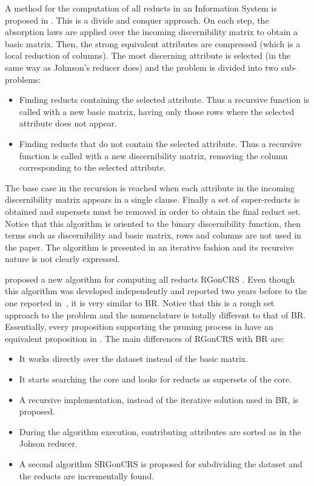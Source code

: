 \documentclass[authoryear,11pt]{elsarticle}
\makeatletter
\newcommand{\setword}[2]{%
  \phantomsection
  #1\def\@currentlabel{\unexpanded{#1}}\label{#2}%
}
\makeatother
\begin{document}
  A method for the computation of all reducts in an Information System is proposed in
  \citep{Starzyk99,Starzyk00}.
  This is a divide and conquer approach. On each step, the absorption laws are applied over the incoming
  discernibility matrix to obtain a basic matrix. Then, the strong equivalent attributes are compressed
  (which is a local reduction of columns). The most discerning attribute is selected (in the same way as 
  Johnson's reducer does) and the problem is divided into two sub-problems: 
  \begin{itemize}
  \item Finding reducts containing the selected attribute. Thus a recursive function is called with a new basic 
  matrix, having only those rows where the selected attribute does not appear.
  \item Finding reducts that do not contain the selected attribute. Thus a recursive function is called with a new 
  discernibility matrix, removing the column corresponding to the selected attribute.
  \end{itemize}
  The base case in the recursion is reached when each attribute in the incoming discernibility matrix appears 
  in a single clause. Finally a set of super-reducts is obtained and supersets must be removed in order to obtain 
  the final reduct set.
  Notice that this algorithm is oriented to the binary discernibility function, then 
  terms such as discernibility and basic matrix, rows and columns are not used in the paper. The
  algorithm is presented in an iterative fashion and its recursive nature is not clearly expressed.
  
  \cite{WangP07} proposed a new algorithm for computing all reducts \setword{RGonCRS}{RGonCRS}. 
  Even though this algorithm 
  was developed independently and reported two years before to the one reported in~\citep{Lias09}, it is very 
  similar to BR. Notice that this is a rough set approach to the problem and the nomenclature is totally 
  different to that of BR. Essentially, every proposition supporting the pruning process in \citep{WangP07} 
  have an equivalent proposition in \citep{Lias09}. The main differences of RGonCRS with BR are:
  \begin{itemize}
  \item It works directly over the dataset instead of the basic matrix.
  \item It starts searching the core and looks for reducts as supersets of the core.
  \item A recursive implementation, instead of the iterative solution used in BR, is proposed.
  \item During the algorithm execution, contributing attributes are sorted as in the Johson reducer.
  \item A second algorithm \setword{SRGonCRS}{SRGonCRS} is proposed for subdividing the dataset and the reducts are
  		incrementally found.
  \end{itemize}
  
\end{document}

